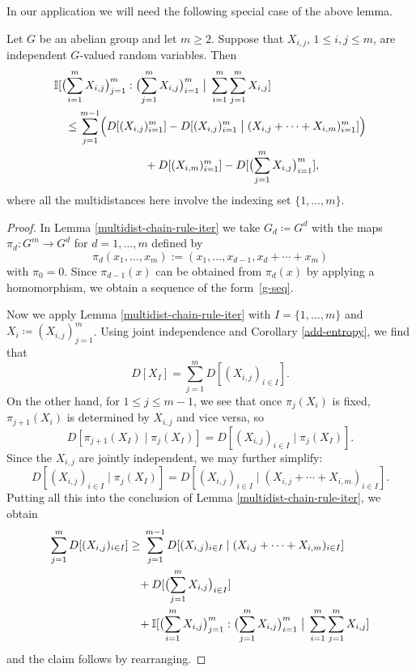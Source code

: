   In our application we will need the following special case of the above lemma.

  \begin{corollary}\label{cor-multid} Let $G$ be an abelian group and let $m \geq 2$.  Suppose that $X_{i,j}$, $1 \leq i, j \leq m$, are independent $G$-valued random variables.
    Then
    \begin{align*}
      &\mathbb{I}[ \bigl(\sum_{i=1}^m X_{i,j}\bigr)_{j =1}^{m} : \bigl(\sum_{j=1}^m X_{i,j}\bigr)_{i = 1}^m \; \big| \; \sum_{i=1}^m \sum_{j = 1}^m  X_{i,j} ] \\
      &\quad \leq \sum_{j=1}^{m-1} \Bigl(D[(X_{i, j})_{i = 1}^m] - D[ (X_{i, j})_{i = 1}^m  \; \big| \; (X_{i,j} + \cdots + X_{i,m})_{i =1}^m ]\Bigr) \\ & \qquad\qquad\qquad\qquad +  D[(X_{i,m})_{i=1}^m] - D[ \bigl(\sum_{j=1}^m X_{i,j}\bigr)_{i=1}^m ],
    \end{align*}
  where all the multidistances here involve the indexing set $\{1,\dots, m\}$.
  \end{corollary}

  \begin{proof}
    In Lemma \ref{multidist-chain-rule-iter} we take $G_d \coloneqq G^d$ with the maps $\pi_d \colon G^m \to G^d$ for $d=1,\dots,m$ defined by
  \[
    \pi_d(x_1,\dots,x_m) := (x_1,\dots,x_{d-1}, x_d + \cdots + x_m)
  \]
  with $\pi_0=0$. Since $\pi_{d-1}(x)$ can be obtained from $\pi_{d}(x)$ by applying a homomorphism, we obtain a sequence of the form~\eqref{g-seq}.

  Now we apply Lemma \ref{multidist-chain-rule-iter} with $I = \{1,\dots, m\}$ and $X_i \coloneqq (X_{i,j})_{j = 1}^m$.  Using joint independence and Corollary \ref{add-entropy}, we find that
  \[
    D[ X_{I} ] = \sum_{j=1}^m D[ (X_{i,j})_{i \in I} ].
  \]
  On the other hand, for $1 \leq j \leq m-1$, we see that once $\pi_{j}(X_i)$ is fixed, $\pi_{j+1}(X_i)$ is determined by $X_{i, j}$ and vice versa, so
  \[
    D[ \pi_{j+1}(X_{I}) \; | \; \pi_{j}(X_{I}) ] = D[ (X_{i, j})_{i \in I} \; | \; \pi_{j}(X_{I} )].
  \]
  Since the $X_{i,j}$ are jointly independent, we may further simplify:
  \[
    D[ (X_{i, j})_{i \in I} \; | \; \pi_{j}(X_{I})] = D[ (X_{i,j})_{i \in I} \; | \; ( X_{i, j} + \cdots + X_{i, m})_{i \in I} ].
  \]
  Putting all this into the conclusion of Lemma \ref{multidist-chain-rule-iter}, we obtain
  \[
    \sum_{j=1}^{m} D[ (X_{i,j})_{i \in I} ]
    \geq
    \begin{aligned}[t]
    &\sum_{j=1}^{m-1} D[ (X_{i,j})_{i \in I} \; | \; (X_{i,j} + \cdots + X_{i,m})_{i \in I} ] \\
    &\!\!\!+
    D[ \bigl(\sum_{j=1}^m X_{i,j}\bigr)_{i \in I}] \\
    &\!\!\!+\mathbb{I}[  \bigl(\sum_{i=1}^m X_{i,j}\bigr)_{j =1}^{m} : \bigl(\sum_{j=1}^m X_{i,j}\bigr)_{i = 1}^m \; \big| \; \sum_{i=1}^m \sum_{j = 1}^m  X_{i,j} ]
    \end{aligned}
  \]
  and the claim follows by rearranging.
\end{proof}

